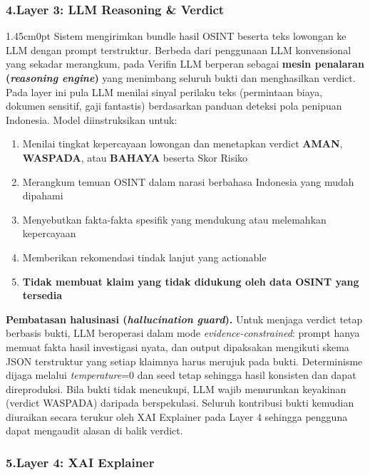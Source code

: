 \documentclass[12pt,a4paper]{article}
\begin{document}
\subsubsection*{4.\quad Layer 3: LLM Reasoning \& Verdict}

\begin{adjustwidth}{1.45cm}{0pt}
\hspace*{0.85cm}Sistem mengirimkan bundle hasil OSINT beserta teks lowongan ke LLM
dengan prompt terstruktur. Berbeda dari penggunaan LLM konvensional yang sekadar merangkum, pada
Verifin LLM berperan sebagai \textbf{mesin penalaran (\textit{reasoning engine})} yang menimbang
seluruh bukti dan menghasilkan verdict. Pada layer ini pula LLM menilai sinyal perilaku teks
(permintaan biaya, dokumen sensitif, gaji fantastis) berdasarkan panduan deteksi pola penipuan
Indonesia. Model diinstruksikan untuk:
\begin{enumerate}[label=\textbf{\alph*.}, labelindent=0pt, leftmargin=*]
\item Menilai tingkat kepercayaan lowongan dan menetapkan verdict \textbf{AMAN}, \textbf{WASPADA}, atau \textbf{BAHAYA} beserta Skor Risiko
\item Merangkum temuan OSINT dalam narasi berbahasa Indonesia yang mudah dipahami
\item Menyebutkan fakta-fakta spesifik yang mendukung atau melemahkan kepercayaan
\item Memberikan rekomendasi tindak lanjut yang actionable
\item \textbf{Tidak membuat klaim yang tidak didukung oleh data OSINT yang tersedia}
\end{enumerate}

\textbf{Pembatasan halusinasi (\textit{hallucination guard}).} Untuk menjaga verdict tetap berbasis bukti, LLM beroperasi dalam mode
\textit{evidence-constrained}: prompt hanya memuat fakta hasil investigasi nyata, dan output
dipaksakan mengikuti skema JSON terstruktur yang setiap klaimnya harus merujuk pada bukti.
Determinisme dijaga melalui \textit{temperature}=0 dan seed tetap sehingga hasil konsisten dan
dapat direproduksi. Bila bukti tidak mencukupi, LLM wajib menurunkan keyakinan (verdict WASPADA)
daripada berspekulasi. Seluruh kontribusi bukti kemudian diuraikan secara terukur oleh XAI
Explainer pada Layer 4 sehingga pengguna dapat mengaudit alasan di balik verdict.
\end{adjustwidth}

\subsubsection*{5.\quad Layer 4: XAI Explainer}
\end{document}
